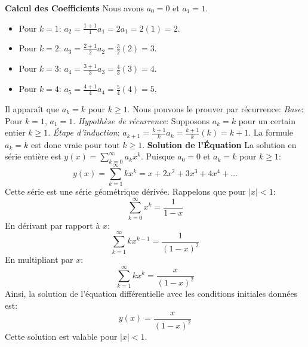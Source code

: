 {{\textbf{Calcul des Coefficients}
Nous avons $a_0=0$ et $a_1=1$.
\begin{itemize}
    \item Pour $k=1$: $a_2 = \frac{1+1}{1} a_1 = 2a_1 = 2(1) = 2$.
    \item Pour $k=2$: $a_3 = \frac{2+1}{2} a_2 = \frac{3}{2}(2) = 3$.
    \item Pour $k=3$: $a_4 = \frac{3+1}{3} a_3 = \frac{4}{3}(3) = 4$.
    \item Pour $k=4$: $a_5 = \frac{4+1}{4} a_4 = \frac{5}{4}(4) = 5$.
\end{itemize}
Il apparaît que $a_k = k$ pour $k \ge 1$. Nous pouvons le prouver par récurrence:
\textit{Base}: Pour $k=1$, $a_1=1$.
\textit{Hypothèse de récurrence}: Supposons $a_k=k$ pour un certain entier $k \ge 1$.
\textit{Étape d'induction}: $a_{k+1} = \frac{k+1}{k} a_k = \frac{k+1}{k} (k) = k+1$.
La formule $a_k=k$ est donc vraie pour tout $k \ge 1$.
\newpage
\textbf{Solution de l'Équation}
La solution en série entière est $y(x) = \sum_{k=0}^{\infty} a_k x^k$.
Puisque $a_0=0$ et $a_k=k$ pour $k \ge 1$:
$$y(x) = \sum_{k=1}^{\infty} k x^k = x + 2x^2 + 3x^3 + 4x^4 + \dots$$
Cette série est une série géométrique dérivée. Rappelons que pour $|x|<1$:
$$\sum_{k=0}^{\infty} x^k = \frac{1}{1-x}$$
En dérivant par rapport à $x$:
$$\sum_{k=1}^{\infty} k x^{k-1} = \frac{1}{(1-x)^2}$$
En multipliant par $x$:
$$\sum_{k=1}^{\infty} k x^k = \frac{x}{(1-x)^2}$$
Ainsi, la solution de l'équation différentielle avec les conditions initiales données est:
$$y(x) = \frac{x}{(1-x)^2}$$
Cette solution est valable pour $|x|<1$.
}
}














